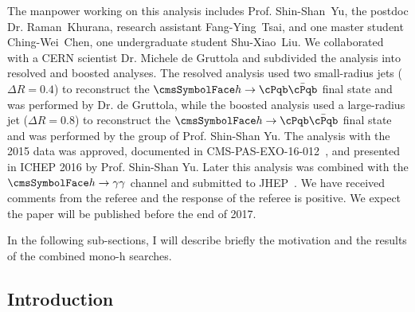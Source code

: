 The manpower working on this analysis includes Prof. Shin-Shan~Yu, the postdoc 
Dr. Raman~Khurana, research assistant Fang-Ying~Tsai, and one master student 
Ching-Wei~Chen, one undergraduate student Shu-Xiao~Liu. We collaborated with 
a CERN scientist Dr. Michele de Gruttola and subdivided the analysis into 
resolved and boosted analyses. 
The resolved analysis used two small-radius jets ($\Delta R = 0.4$) to 
reconstruct the $\Ph\rightarrow\cPqb\bar{\cPqb}$ final state and was performed 
by Dr. de Gruttola, while the boosted analysis used a large-radius jet 
($\Delta R=0.8$) to reconstruct the $\Ph\rightarrow\cPqb\bar{\cPqb}$ final 
state and was performed by the group of Prof. Shin-Shan Yu. 
The analysis with the 2015 data was approved, documented in 
CMS-PAS-EXO-16-012~\cite{CMS-PAS-EXO-16-012}, and presented in ICHEP 2016 by 
Prof. Shin-Shan Yu. Later this analysis was combined with the 
 $\Ph\rightarrow\gamma\gamma$ channel and submitted to JHEP~\cite{Sirunyan:2017hnk}. 
We have received comments from the referee and the response of the referee 
is positive. We expect the paper will be published before the end of 
2017. 

In the following sub-sections, I will describe briefly the motivation and the 
results of the combined mono-h searches.

\subsection{Introduction}

